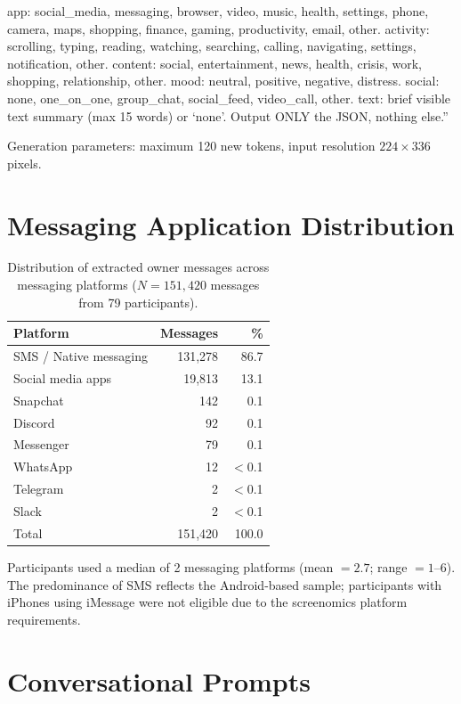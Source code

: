 \documentclass[review,12pt,authoryear]{elsarticle}
\begin{document}
app: social\_media, messaging, browser, video, music, health, settings, phone, camera, maps, shopping, finance, gaming, productivity, email, other. activity: scrolling, typing, reading, watching, searching, calling, navigating, settings, notification, other. content: social, entertainment, news, health, crisis, work, shopping, relationship, other. mood: neutral, positive, negative, distress. social: none, one\_on\_one, group\_chat, social\_feed, video\_call, other. text: brief visible text summary (max 15 words) or `none'. Output ONLY the JSON, nothing else.''

Generation parameters: maximum 120 new tokens, input resolution $224 \times 336$ pixels.

\section{Messaging Application Distribution}\label{app:apps}

\begin{table}[h]
\centering
\caption{Distribution of extracted owner messages across messaging platforms ($N = 151{,}420$ messages from 79 participants).}
\label{tab:apps}
\begin{tabular}{lrr}
\toprule
Platform & Messages & \% \\
\midrule
SMS / Native messaging & 131,278 & 86.7 \\
Social media apps & 19,813 & 13.1 \\
Snapchat & 142 & 0.1 \\
Discord & 92 & 0.1 \\
Messenger & 79 & 0.1 \\
WhatsApp & 12 & $<$0.1 \\
Telegram & 2 & $<$0.1 \\
Slack & 2 & $<$0.1 \\
\midrule
Total & 151,420 & 100.0 \\
\bottomrule
\end{tabular}
\end{table}

Participants used a median of 2 messaging platforms (mean $= 2.7$; range $= 1$--6). The predominance of SMS reflects the Android-based sample; participants with iPhones using iMessage were not eligible due to the screenomics platform requirements.

\section{Conversational Prompts}\label{app:prompts}
\end{document}
